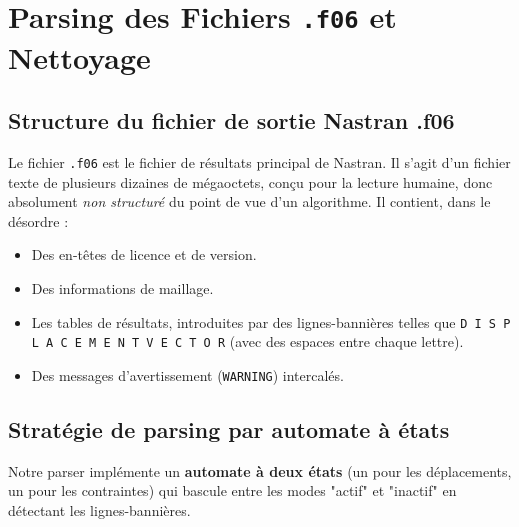 \documentclass[journal, a4paper, twocolumn]{IEEEtran}
\begin{document}
\section{Parsing des Fichiers \texttt{.f06} et Nettoyage}

\subsection{Structure du fichier de sortie Nastran .f06}

Le fichier \texttt{.f06} est le fichier de résultats principal de Nastran. Il s'agit d'un fichier texte de plusieurs dizaines de mégaoctets, conçu pour la lecture humaine, donc absolument \emph{non structuré} du point de vue d'un algorithme. Il contient, dans le désordre :
\begin{itemize}
    \item Des en-têtes de licence et de version.
    \item Des informations de maillage.
    \item Les tables de résultats, introduites par des lignes-bannières telles que \texttt{D I S P L A C E M E N T   V E C T O R} (avec des espaces entre chaque lettre).
    \item Des messages d'avertissement (\texttt{WARNING}) intercalés.
\end{itemize}

\subsection{Stratégie de parsing par automate à états}

Notre parser implémente un \textbf{automate à deux états} (un pour les déplacements, un pour les contraintes) qui bascule entre les modes "actif" et "inactif" en détectant les lignes-bannières.
\end{document}
